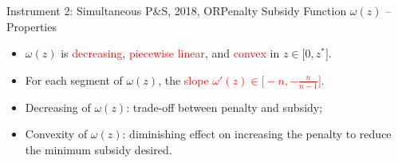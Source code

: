 \documentclass[14pt]{beamer}
\begin{document}
\begin{frame}{Instrument 2: Simultaneous P\&S, {\footnotesize 2018, OR}}{Penalty Subsidy Function $\omega(z)$ -- Properties}
\small
\begin{theorem}
\rm
	\begin{itemize}
	\justifying
		\item $\omega(z)$ is \textcolor{red}{decreasing}, \textcolor{red}{piecewise linear}, and \textcolor{red}{convex} in $z \in\big[ 0,z^* \big]$.
\item For each segment of $\omega(z)$, the \textcolor{red}{slope $\omega'(z) \in \big[ -n, -\frac{n}{n-1}\big]$}.
	\end{itemize}
\end{theorem}
\begin{shaded}
\vspace{-2mm}
\begin{itemize}
\justifying
	\item Decreasing of $\omega(z)$: trade-off between penalty and subsidy;
	\item Convexity of $\omega(z)$: diminishing effect on increasing the penalty to reduce the minimum subsidy desired.
\end{itemize}
\vspace{-2mm}
\end{shaded}
\end{frame}
\end{document}
